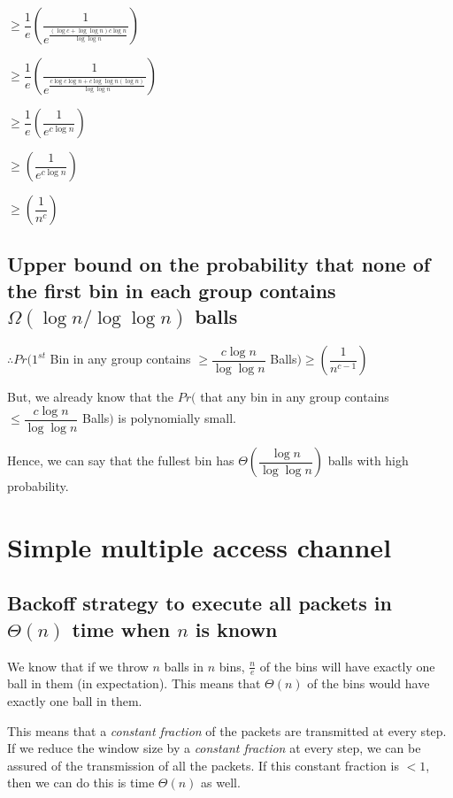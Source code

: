 \documentclass{article}
\begin{document}
$\ge \dfrac{1}{e} \left(\dfrac{1}{{e}^{\frac{(\log{c} + \log{\log{n}})c\log{n}}{\log{\log{n}}}}} \right)$

$\ge \dfrac{1}{e} \left(\dfrac{1}{{e}^{\frac{c\log{c}\log{n} + c\log{\log{n}}(\log{n})}{\log{\log{n}}}}} \right)$ 

$\ge \dfrac{1}{e} \left(\dfrac{1}{{e}^{c\log{n}}} \right)$

$\ge \left(\dfrac{1}{{e}^{c\log{n}}} \right)$

$\ge \left(\dfrac{1}{n^{c}} \right)$

\subsection{Upper bound on the probability that none of the first bin in each group contains $\Omega(\log{n}/\log{\log{n}})$ balls}

$\therefore Pr(1^{st}$ Bin in any group contains $\ge \dfrac{c\log{n}}{\log{\log{n}}}$ Balls$) \ge \left(\dfrac{1}{n^{c-1}} \right)$

But, we already know that the $Pr($ that any bin in any group contains $\le \dfrac{c\log{n}}{\log{\log{n}}}$ Balls$)$ is polynomially small.

Hence, we can say that the fullest bin has $\Theta\left(\dfrac{\log{n}}{\log{\log{n}}}\right)$ balls with high probability.

\clearpage

\section {Simple multiple access channel}

\subsection{Backoff strategy to execute all packets in $\Theta(n)$ time when $n$ is \textbf{known}}

We know that if we throw $n$ balls in $n$ bins, $\frac{n}{e}$ of the
bins will have exactly one ball in them (in expectation). This means
that $\Theta(n)$ of the bins would have exactly one ball in them.

This means that a \textit{constant fraction} of the packets are
transmitted at every step. If we reduce the window size by a
\textit{constant fraction} at every step, we can be assured of the
transmission of all the packets. If this constant fraction is $< 1$,
then we can do this is time $\Theta(n)$ as well.
\end{document}
